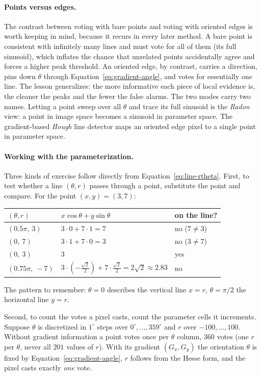\paragraph{Points versus edges.}
The contrast between voting with bare points and voting with oriented edges is
worth keeping in mind, because it recurs in every later method. A bare point is
consistent with infinitely many lines and must vote for all of them (its full
sinusoid), which inflates the chance that unrelated points accidentally agree and
forces a higher peak threshold. An oriented edge, by contrast, carries a
direction, pins down $\theta$ through Equation~\eqref{eq:gradient-angle}, and
votes for essentially one line. The lesson generalizes: the more informative each
piece of local evidence is, the cleaner the peaks and the fewer the false alarms.
The two modes carry two names. Letting a point sweep over all $\theta$ and trace
its full sinusoid is the \emph{Radon} view: a point in image space becomes a
sinusoid in parameter space. The gradient-based \emph{Hough} line detector maps
an oriented edge pixel to a single point in parameter space.

\paragraph{Working with the parameterization.}
Three kinds of exercise follow directly from Equation~\eqref{eq:line-rtheta}.
First, to test whether a line $(\theta,r)$ passes through a point, substitute the
point and compare. For the point $(x,y)=(3,7)$:
\begin{center}
  \begin{tabular}{@{}lll@{}}
    \toprule
    $(\theta, r)$ & $x\cos\theta + y\sin\theta$ & on the line? \\
    \midrule
    $(0.5\pi,\ 3)$ & $3\cdot 0 + 7\cdot 1 = 7$ & no ($7\neq 3$) \\
    $(0,\ 7)$ & $3\cdot 1 + 7\cdot 0 = 3$ & no ($3\neq 7$) \\
    $(0,\ 3)$ & $3$ & yes \\
    $(0.75\pi,\ -7)$ & $3\cdot(-\tfrac{\sqrt2}{2}) + 7\cdot\tfrac{\sqrt2}{2}
      = 2\sqrt2 \approx 2.83$ & no \\
    \bottomrule
  \end{tabular}
\end{center}
\noindent
The pattern to remember: $\theta = 0$ describes the vertical line $x = r$,
$\theta = \pi/2$ the horizontal line $y = r$.

Second, to count the votes a pixel casts, count the parameter cells it
increments. Suppose $\theta$ is discretized in $1^\circ$ steps over
$0^\circ,\dots,359^\circ$ and $r$ over $-100,\dots,100$. Without gradient
information a point votes once per $\theta$ column, $360$ votes (one $r$ per
$\theta$, never all $201$ values of $r$). With its gradient
$(G_x,G_y)$ the orientation $\theta$ is fixed by
Equation~\eqref{eq:gradient-angle}, $r$ follows from the Hesse form, and the
pixel casts exactly \emph{one} vote.

